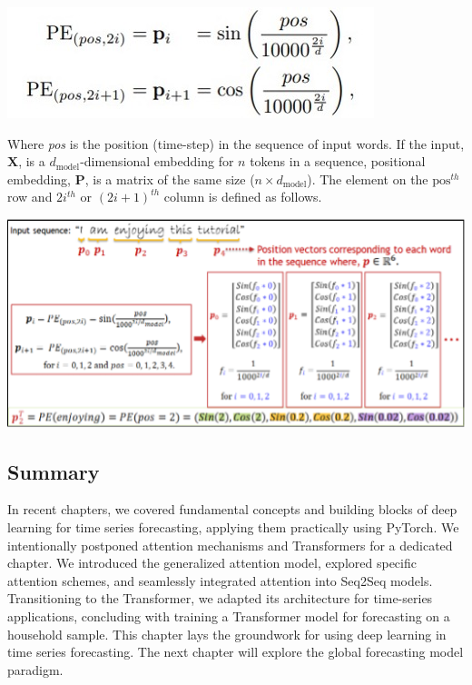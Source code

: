 \documentclass{article}
\begin{document}
\begin{center}
    \includegraphics[width=.5\textwidth]{Picture7.jpg}
\end{center}

Where \textit{pos} is the position (time-step) in the sequence of input words. If the input, $\mathbf{X}$, is a $d_{\text{model}}$-dimensional embedding for $n$ tokens in a sequence, positional embedding, $\mathbf{P}$, is a matrix of the same size ($n \times d_{\text{model}}$). The element on the $\text{pos}^{th}$ row and $2i^{th}$ or $(2i + 1)^{th}$ column is defined as follows.

\begin{center}
    \includegraphics[width=1\textwidth]{Picture8.png}
\end{center}

\subsection{Summary}
In recent chapters, we covered fundamental concepts and building blocks of deep learning for time series forecasting, applying them practically using PyTorch. We intentionally postponed attention mechanisms and Transformers for a dedicated chapter. We introduced the generalized attention model, explored specific attention schemes, and seamlessly integrated attention into Seq2Seq models. Transitioning to the Transformer, we adapted its architecture for time-series applications, concluding with training a Transformer model for forecasting on a household sample. This chapter lays the groundwork for using deep learning in time series forecasting. The next chapter will explore the global forecasting model paradigm.
\end{document}
